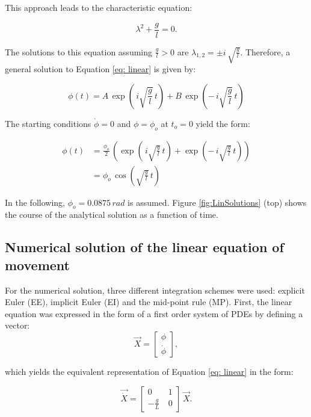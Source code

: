 \documentclass[12pt,bibstyle=none,pagenumberinfooter]{ifmdocument}
\begin{document}
This approach leads to the characteristic equation:

\begin{equation}
    \lambda^2 + \frac{g}{l} = 0.
\end{equation}

The solutions to this equation assuming $\frac{g}{l}>0$ are $\lambda_{1,2} = \pm i\,\sqrt{\frac{g}{l}}$. Therefore, a general solution to Equation \ref{eq: linear} is given by:

\begin{equation}
    \phi (t) = A\,\exp{\left(\,i\sqrt{\frac{g}{l}}\,t\right)} + B\, \exp{\left(-\,i\sqrt{\frac{g}{l}}\,t\right)}
\end{equation}

The starting conditions $\Dot{\phi} = 0$ and $\phi = \phi_o$ at $t_o = 0$ yield the form:

\begin{align}
    \phi(t)
     & = \frac{\phi_o}{2}\, \left(\exp{\left(\,i\sqrt{\frac{g}{l}}\,t\right)} + \exp{\left(-\,i\sqrt{\frac{g}{l}}\,t\right)} \right) \\
     & = \phi_o\,\cos{\left(\sqrt{\frac{g}{l}}\,t \right)}
\end{align}

In the following, $\phi_o = 0.0875\,rad$ is assumed. Figure \ref{fig:LinSolutions} (top) shows the course of the analytical solution as a function of time.


\subsection{Numerical solution of the linear equation of movement}

For the numerical solution, three different integration schemes were used: explicit Euler (EE), implicit Euler (EI) and the mid-point rule (MP). First, the linear equation was expressed in the form of a first order system of PDEs by defining a vector:
\begin{equation}
    \Vec{X} = \begin{bmatrix}
        \phi \\ \Dot{\phi}
    \end{bmatrix},
\end{equation}

which yields the equivalent representation of Equation \ref{eq: linear} in the form:

\begin{equation}
    \Vec{\Dot{X}} = \begin{bmatrix}
        0 & 1 \\ -\frac{g}{L}\ & 0
    \end{bmatrix} \, \Vec{X}.
    \label{eq: firstOrderSysLin}
\end{equation}
\end{document}
